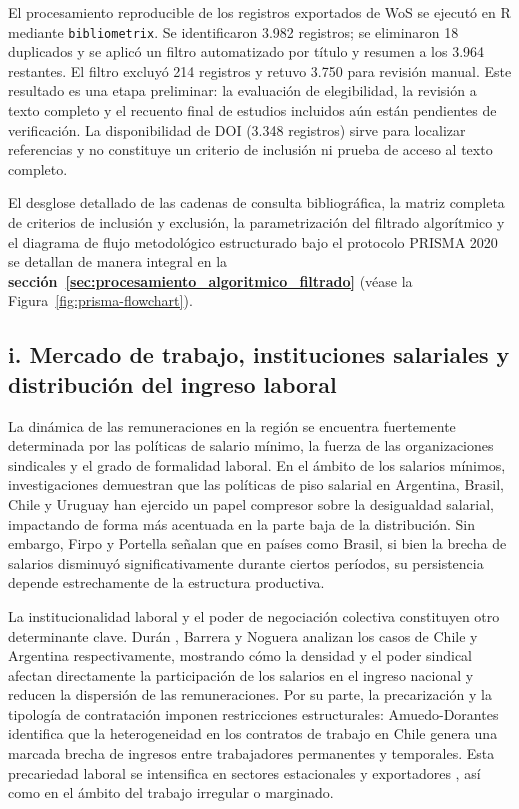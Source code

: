 El procesamiento reproducible de los registros exportados de WoS se ejecutó en R mediante \texttt{bibliometrix}. Se identificaron 3.982 registros; se eliminaron 18 duplicados y se aplicó un filtro automatizado por título y resumen a los 3.964 restantes. El filtro excluyó 214 registros y retuvo 3.750 para revisión manual. Este resultado es una etapa preliminar: la evaluación de elegibilidad, la revisión a texto completo y el recuento final de estudios incluidos aún están pendientes de verificación. La disponibilidad de DOI (3.348 registros) sirve para localizar referencias y no constituye un criterio de inclusión ni prueba de acceso al texto completo.

El desglose detallado de las cadenas de consulta bibliográfica, la matriz completa de criterios de inclusión y exclusión, la parametrización del filtrado algorítmico y el diagrama de flujo metodológico estructurado bajo el protocolo PRISMA 2020 se detallan de manera integral en la \textbf{sección~\ref{sec:procesamiento_algoritmico_filtrado}} (véase la Figura~\ref{fig:prisma-flowchart}).

\subsection{i. Mercado de trabajo, instituciones salariales y distribución del ingreso laboral}

La dinámica de las remuneraciones en la región se encuentra fuertemente determinada por las políticas de salario mínimo, la fuerza de las organizaciones sindicales y el grado de formalidad laboral. En el ámbito de los salarios mínimos, investigaciones demuestran \parencite{MaurizioVazquez2016, GindlingRonconi2025} que las políticas de piso salarial en Argentina, Brasil, Chile y Uruguay han ejercido un papel compresor sobre la desigualdad salarial, impactando de forma más acentuada en la parte baja de la distribución. Sin embargo, Firpo y Portella \parencite*{FirpoPortella2025} señalan que en países como Brasil, si bien la brecha de salarios disminuyó significativamente durante ciertos períodos, su persistencia depende estrechamente de la estructura productiva.

La institucionalidad laboral y el poder de negociación colectiva constituyen otro determinante clave. Durán \parencite*{DuranS2026}, Barrera y Noguera \parencite*{BarreraInsuaNoguera2026} analizan los casos de Chile y Argentina respectivamente, mostrando cómo la densidad y el poder sindical afectan directamente la participación de los salarios en el ingreso nacional y reducen la dispersión de las remuneraciones. Por su parte, la precarización y la tipología de contratación imponen restricciones estructurales: Amuedo-Dorantes \parencite*{Amuedo-Dorantes2005} identifica que la heterogeneidad en los contratos de trabajo en Chile genera una marcada brecha de ingresos entre trabajadores permanentes y temporales. Esta precariedad laboral se intensifica en sectores estacionales y exportadores \parencite{TapiaCatalanMarchantSantiago2025}, así como en el ámbito del trabajo irregular o marginado.

